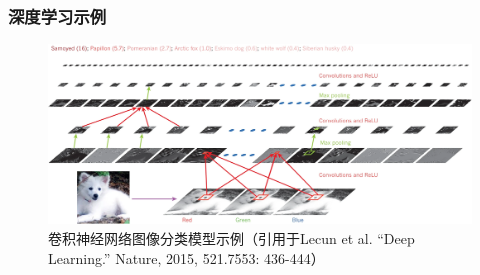 \begin{frame}
    \frametitle{深度学习示例}

    \begin{figure}[t!]
        \centering
        \includegraphics[width = \linewidth]{float/ch.intro/lecun.png}
        \caption*{卷积神经网络图像分类模型示例（引用于Lecun et al. “Deep Learning.” Nature, 2015, 521.7553: 436-444）}
    \end{figure}

\end{frame}

